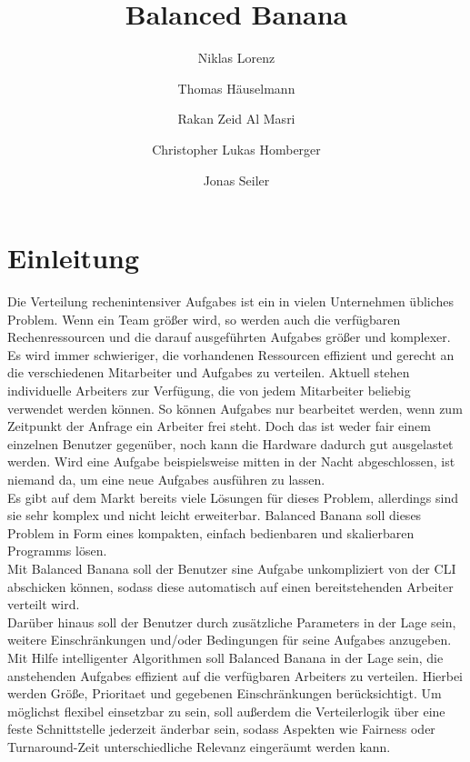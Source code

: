 \documentclass[a4paper,12pt]{article}
\title{Balanced Banana}
\author{Niklas Lorenz \and Thomas Häuselmann \and Rakan Zeid Al Masri \and Christopher Lukas Homberger \and Jonas Seiler}
\begin{document}
\setcounter{page}{2}
\tableofcontents          %
\clearpage
{}

\section{Einleitung}
\vspace*{1cm}

Die Verteilung rechenintensiver \glspl{Aufgabe} ist ein in vielen Unternehmen übliches Problem. Wenn ein Team größer wird, so werden auch die verfügbaren Rechenressourcen und die darauf ausgeführten \glspl{Aufgabe} größer und komplexer.\\


Es wird immer schwieriger, die vorhandenen Ressourcen effizient und gerecht an die verschiedenen Mitarbeiter und \glspl{Aufgabe} zu verteilen.
Aktuell stehen individuelle \glspl{Arbeiter} zur Verfügung, die von jedem Mitarbeiter beliebig verwendet werden können. So können \glspl{Aufgabe} nur bearbeitet werden, wenn zum Zeitpunkt der Anfrage ein \gls{Arbeiter} frei steht. Doch das ist weder fair einem einzelnen \gls{Benutzer} gegenüber, noch kann die Hardware dadurch gut ausgelastet werden. Wird eine \gls{Aufgabe} beispielsweise mitten in der Nacht abgeschlossen, ist niemand da, um eine neue \glspl{Aufgabe} ausführen zu lassen. \\


Es gibt auf dem Markt bereits viele Lösungen für dieses Problem, allerdings sind sie sehr komplex und nicht leicht erweiterbar.
Balanced Banana soll dieses Problem in Form eines kompakten, einfach bedienbaren und skalierbaren Programms lösen. \\

Mit Balanced Banana soll der \gls{Benutzer} sine \gls{Aufgabe} unkompliziert von der \gls{CLI} abschicken können, sodass diese automatisch auf einen bereitstehenden \gls{Arbeiter} verteilt wird. \\

Darüber hinaus soll der \gls{Benutzer} durch zusätzliche \glspl{Parameter} in der Lage sein, weitere Einschränkungen und/oder Bedingungen für seine \glspl{Aufgabe} anzugeben.\\

Mit Hilfe intelligenter Algorithmen soll Balanced Banana in der Lage sein, die anstehenden \glspl{Aufgabe} effizient auf die verfügbaren \glspl{Arbeiter} zu verteilen. Hierbei werden Größe, \gls{Prioritaet} und gegebenen Einschränkungen berücksichtigt. Um möglichst flexibel einsetzbar zu sein, soll außerdem die \gls{Verteilerlogik} über eine feste \gls{Schnittstelle} jederzeit änderbar sein, sodass Aspekten wie Fairness oder \gls{Turnaround}-Zeit unterschiedliche Relevanz eingeräumt werden kann.
\end{document}
